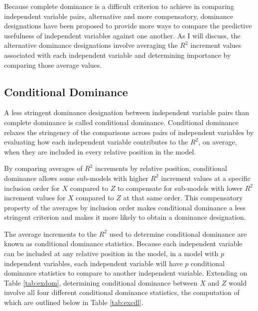 \documentclass[man]{apa7}
\begin{document}
	Because complete dominance is a difficult criterion to achieve in comparing independent variable pairs, alternative and more compensatory, dominance designations have been proposed to provide more ways to compare the predictive usefulness of independent variables against one another.
	As I will discuss, the alternative dominance designations involve averaging the $R^2$ increment values associated with each independent variable and determining importance by comparing those average values.
	
	\subsection{Conditional Dominance}
	
	A less stringent dominance designation between independent variable pairs than complete dominance is called conditional dominance.
	Conditional dominance relaxes the stringency of the comparisons across pairs of independent variables by evaluating how each independent variable contributes to the $R^2$, on average, when they are included in every relative position in the model.
	
	By comparing averages of $R^2$ increments by relative position, conditional dominance allows some sub-models with higher $R^2$ increment values at a specific inclusion order for $X$ compared to $Z$ to compensate for sub-models with lower $R^2$ increment values for $X$ compared to $Z$ at that same order.
	This compensatory property of the averages by inclusion order makes conditional dominance a less stringent criterion and makes it more likely to obtain a dominance designation.
	
	The average increments to the $R^2$ used to determine conditional dominance are known as conditional dominance statistics.
	Because each independent variable can be included at any relative position in the model, in a model with $p$ independent variables, each independent variable will have $p$ conditional dominance statistics to compare to another independent variable.
	Extending on Table \ref{tab:exdom}, determining conditional dominance between $X$ and $Z$ would involve all four different conditional dominance statistics, the computation of which are outlined below in Table \ref{tab:excdl}.
	
\end{document}

